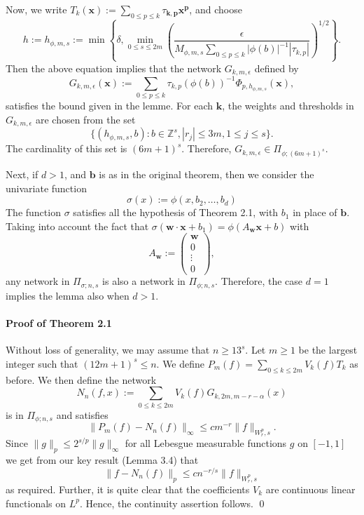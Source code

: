 \documentclass{article}
\begin{document}
Now, we write \( T_k(\mathbf{x}) := \sum_{0\leq p \leq k} \tau_{ \mathbf{k},\mathbf{p} } \mathbf{x}^{\mathbf{p}} \), and choose
\[
h := h_{\phi,m,s} := \min \left\{ \delta, \min_{0\leq s \leq 2m} \left( \frac{\epsilon}{M_{\phi,m,s} \sum_{0 \leq p \leq k} |\phi(b)|^{-1} |\tau_{k,p}|} \right)^{1/2} \right\}.
\]
Then the above equation implies that the network \( G_{k,m,\epsilon} \) defined by
\[
G_{k,m,\epsilon}(\mathbf{x}) := \sum_{0 \leq p \leq k} \tau_{k,p}(\phi(b))^{-1} \Phi_{p,h_{\phi,m,s}}(\mathbf{x}),
\]
satisfies the bound given in the lemme. For each \( \mathbf{k} \), the weights and thresholds in \( G_{k,m,\epsilon} \) are chosen from the set
\[
\{ (h_{\phi,m,s}, b) : b \in \mathbb{Z}^s, |r_{j}| \leq 3m, 1 \leq j \leq s \}.
\]
The cardinality of this set is \( (6m + 1)^s \). Therefore, \( G_{k,m,\epsilon} \in \Pi_{\phi;(6m+1)^s} \).

Next, if \(d >1\), and \(\mathbf{b}\) is as in the original theorem, then we consider the univariate function
\[
    \sigma (x) := \phi (x, b_2, \ldots, b_d)
\]
The function \( \sigma \) satisfies all the hypothesis of Theorem 2.1, with \( b_1 \) in place of \( \mathbf{b}  \). Taking into account the fact that \( \sigma(\mathbf{w} \cdot \mathbf{x} + b_1) = \phi(A_{\mathbf{w}}\mathbf{x} + b) \) with
\[
A_{\mathbf{w}} := \begin{pmatrix}
\mathbf{w} \\
0 \\
\vdots \\
0
\end{pmatrix},
\]
any network in \( \Pi_{\sigma;n,s} \) is also a network in \( \Pi_{\phi;n,s} \). Therefore, the case \( d = 1 \) implies the lemma also when \( d > 1 \).

\paragraph[short]{Proof of Theorem 2.1}

Without loss of generality, we may assume that \( n \geq 13^s \). Let \( m \geq 1 \) be the largest integer such that \( (12m + 1)^s \leq n \). We define \( P_m(f) = \sum_{0 \leq k \leq 2m} V_k(f)T_k \) as before. We then define the network
\[
N_n(f, x) := \sum_{0 \leq k \leq 2m} V_k(f)G_{k,2m,m-r-\alpha}(x)
\]
is in \( \Pi_{\phi;n,s} \) and satisfies
\[
\| P_m(f) - N_n(f) \|_{\infty} \leq cm^{-r} \| f \|_{W_r^p, s}.
\]
Since \( \| g \|_p \leq 2^{s/p} \| g \|_{\infty} \) for all Lebesgue measurable functions \( g \) on \( [-1,1] \) we get from our key result (Lemma 3.4) that
\[
\| f - N_n(f) \|_p \leq cn^{-r/s} \| f \|_{W_r^p, s}
\]
as required. Further, it is quite clear that the coefficients \( V_k \) are continuous linear functionals on \( L^p \). Hence, the continuity assertion follows. \qed
\end{document}
